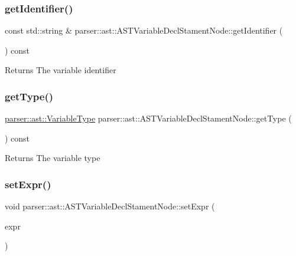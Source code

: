 \subsubsection{\texorpdfstring{get\+Identifier()}{getIdentifier()}}
{\footnotesize\ttfamily const std\+::string \& parser\+::ast\+::\+A\+S\+T\+Variable\+Decl\+Stament\+Node\+::get\+Identifier (\begin{DoxyParamCaption}{ }\end{DoxyParamCaption}) const}

\begin{DoxyReturn}{Returns}
The variable identifier 
\end{DoxyReturn}
\mbox{\label{classparser_1_1ast_1_1ASTVariableDeclStamentNode_a78eb935a42c6850bb965d9909cb35d79}} 
\subsubsection{\texorpdfstring{get\+Type()}{getType()}}
{\footnotesize\ttfamily \hyperlink{ASTVariableDeclStamentNode_8h_a1e8e1bde0729627e3a22ffa858d5f3b9}{parser\+::ast\+::\+Variable\+Type} parser\+::ast\+::\+A\+S\+T\+Variable\+Decl\+Stament\+Node\+::get\+Type (\begin{DoxyParamCaption}{ }\end{DoxyParamCaption}) const}

\begin{DoxyReturn}{Returns}
The variable type 
\end{DoxyReturn}
\mbox{\label{classparser_1_1ast_1_1ASTVariableDeclStamentNode_a01a4ffd87fd267a4cf592c56c9b1eda6}} 
\subsubsection{\texorpdfstring{set\+Expr()}{setExpr()}\hspace{0.1cm}{\footnotesize\ttfamily [1/2]}}
{\footnotesize\ttfamily void parser\+::ast\+::\+A\+S\+T\+Variable\+Decl\+Stament\+Node\+::set\+Expr (\begin{DoxyParamCaption}\item[{const \hyperlink{classparser_1_1ast_1_1ASTExprNode}{A\+S\+T\+Expr\+Node} $\ast$}]{expr }\end{DoxyParamCaption})}


